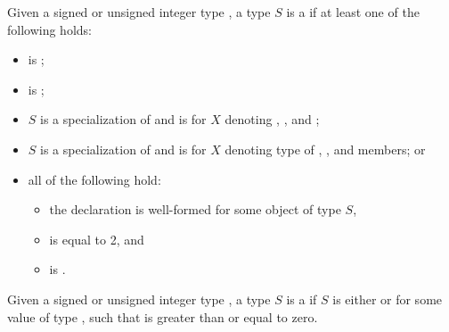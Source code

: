 \pnum
Given a signed or unsigned integer type ,
a type $S$ is a
if at least one of the following holds:
\begin{itemize}
\item
   is ;
\item
   is ;
\item
  $S$ is a specialization of  and
   is  for $X$ denoting
  ,
  , and
  ;
\item
  $S$ is a specialization of  and
   is  for $X$ denoting type of
  ,
  , and
   members; or
\item
  all of the following hold:
  \begin{itemize}
  \item
    the declaration  is well-formed
    for some object  of type $S$,
  \item
     is equal to 2, and
  \item
     is .
  \end{itemize}
\end{itemize}

\pnum
Given a signed or unsigned integer type ,
a type $S$ is a
if $S$ is either  or 
for some value  of type ,
such that  is greater than or equal to zero.

